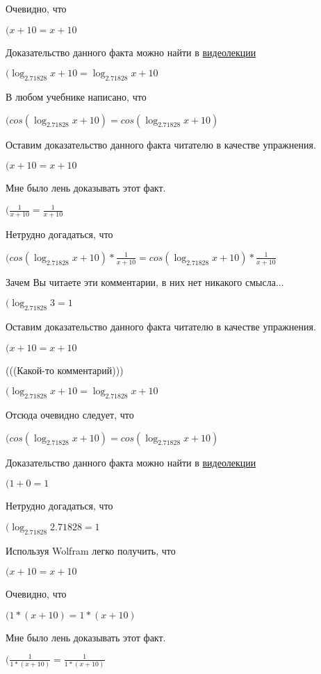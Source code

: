 \documentclass[12pt,a4paper,fleqn]{article}
\theoremstyle{definition}
\begin{document}
Очевидно, что

$( x  +  10  =  x  +  10 $

Доказательство данного факта можно найти в \href{https://www.youtube.com/watch?v=dQw4w9WgXcQ}{видеолекции}

$(\log_{ 2.71828 }{ x  +  10 } = \log_{ 2.71828 }{ x  +  10 }$

В любом учебнике написано, что

$(cos(\log_{ 2.71828 }{ x  +  10 }) = cos(\log_{ 2.71828 }{ x  +  10 })$

Оставим доказательство данного факта читателю в качестве упражнения.

$( x  +  10  =  x  +  10 $

Мне было лень доказывать этот факт.

$(\frac{ 1 }{ x  +  10 }
 = \frac{ 1 }{ x  +  10 }
$

Нетрудно догадаться, что

$(cos(\log_{ 2.71828 }{ x  +  10 }) * \frac{ 1 }{ x  +  10 }
 = cos(\log_{ 2.71828 }{ x  +  10 }) * \frac{ 1 }{ x  +  10 }
$

Зачем Вы читаете эти комментарии, в них нет никакого смысла...

$(\log_{ 2.71828 }{ 3 } =  1 $

Оставим доказательство данного факта читателю в качестве упражнения.

$( x  +  10  =  x  +  10 $

(((Какой-то комментарий)))

$(\log_{ 2.71828 }{ x  +  10 } = \log_{ 2.71828 }{ x  +  10 }$

Отсюда очевидно следует, что

$(cos(\log_{ 2.71828 }{ x  +  10 }) = cos(\log_{ 2.71828 }{ x  +  10 })$

Доказательство данного факта можно найти в \href{https://www.youtube.com/watch?v=dQw4w9WgXcQ}{видеолекции}

$( 1  +  0  =  1 $

Нетрудно догадаться, что

$(\log_{ 2.71828 }{ 2.71828 } =  1 $

Используя Wolfram легко получить, что

$( x  +  10  =  x  +  10 $

Очевидно, что

$( 1  * ( x  +  10 ) =  1  * ( x  +  10 )$

Мне было лень доказывать этот факт.

$(\frac{ 1 }{ 1  * ( x  +  10 )}
 = \frac{ 1 }{ 1  * ( x  +  10 )}
$
\end{document}
